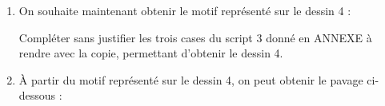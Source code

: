 \begin{enumerate}
    \item On souhaite maintenant obtenir le motif représenté sur le dessin 4 : 
    


    \begin{center}
    \end{center}
    
    Compléter sans justifier les trois cases du script 3 donné en ANNEXE à rendre avec la copie, 
    permettant d'obtenir le dessin 4.\\

    \item À partir du motif représenté sur le dessin 4, on peut obtenir le pavage ci-dessous :
    
    
    \newcommand{\drawfigure}[4]{
        \draw[line width= \figureWidth, 
        shift={(#1, #2)}, 
        xscale=#3, yscale=#4]
        (0,0) -- (0,1) -- (2,1) -- (2,5) -- (4,5) -- (4,6) -- (5,6) -- (5,0) -- (0,0);
    }

    \newcommand{\writeStr}[3]{
        \node[red, font=\bfseries] at (#2, #3) {#1};
    }

    \begin{center}




            


\end{center}
\end{enumerate}
